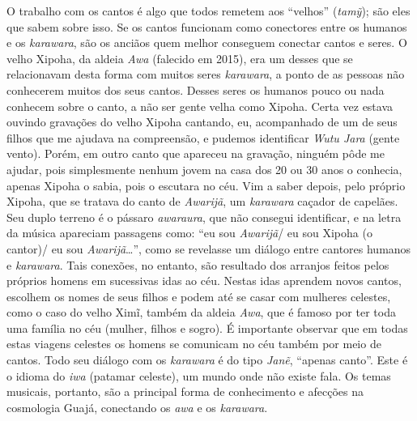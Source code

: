 O trabalho com os cantos é algo que todos remetem aos ``velhos''
(\emph{tamỹ}); são eles que sabem sobre isso. Se os cantos funcionam
como conectores entre os humanos e os \emph{karawara}, são os anciãos
quem melhor conseguem conectar cantos e seres. O velho Xipoha, da aldeia
\emph{Awa} (falecido em 2015), era um desses que se relacionavam desta
forma com muitos seres \emph{karawara}, a ponto de as pessoas não
conhecerem muitos dos seus cantos. Desses seres os humanos pouco ou nada
conhecem sobre o canto, a não ser gente velha como Xipoha. Certa vez
estava ouvindo gravações do velho Xipoha cantando, eu, acompanhado de um
de seus filhos que me ajudava na compreensão, e pudemos identificar
\emph{Wutu Jara} (gente vento). Porém, em outro canto que apareceu na
gravação, ninguém pôde me ajudar, pois simplesmente nenhum jovem na casa
dos 20 ou 30 anos o conhecia, apenas Xipoha o sabia, pois o escutara no
céu. Vim a saber depois, pelo próprio Xipoha, que se tratava do canto de
\emph{Awarijã}, um \emph{karawara} caçador de capelães. Seu duplo
terreno é o pássaro \emph{awaraura}, que não consegui identificar, e na
letra da música apareciam passagens como: ``eu sou \emph{Awarijã}/ eu
sou Xipoha (o cantor)/ eu sou \emph{Awarijã}\ldots{}'', como se revelasse um
diálogo entre cantores humanos e \emph{karawara}. Tais conexões, no
entanto, são resultado dos arranjos feitos pelos próprios homens em
sucessivas idas ao céu. Nestas idas aprendem novos cantos, escolhem os
nomes de seus filhos e podem até se casar com mulheres celestes, como o
caso do velho Ximĩ, também da aldeia \emph{Awa}, que é famoso por ter
toda uma família no céu (mulher, filhos e sogro). É importante observar
que em todas estas viagens celestes os homens se comunicam no céu também
por meio de cantos. Todo seu diálogo com os \emph{karawara} é do tipo
\emph{Janẽ}, ``apenas canto''. Este é o idioma do \emph{iwa} (patamar
celeste), um mundo onde não existe fala. Os temas musicais, portanto,
são a principal forma de conhecimento e afecções na cosmologia Guajá,
conectando os \emph{awa} e os \emph{karawara}.

